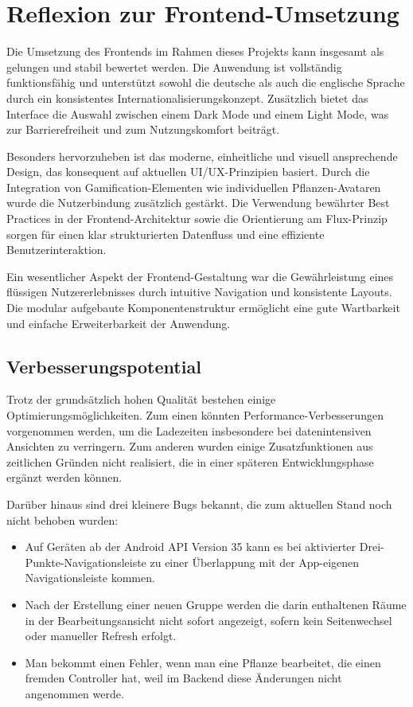 \section{Reflexion zur Frontend-Umsetzung}

Die Umsetzung des Frontends im Rahmen dieses Projekts kann insgesamt als gelungen und stabil bewertet werden. Die Anwendung ist vollständig funktionsfähig und unterstützt sowohl die deutsche als auch die englische Sprache durch ein konsistentes Internationalisierungskonzept. Zusätzlich bietet das Interface die Auswahl zwischen einem Dark Mode und einem Light Mode, was zur Barrierefreiheit und zum Nutzungskomfort beiträgt.

Besonders hervorzuheben ist das moderne, einheitliche und visuell ansprechende Design, das konsequent auf aktuellen UI/UX-Prinzipien basiert. Durch die Integration von Gamification-Elementen wie individuellen Pflanzen-Avataren wurde die Nutzerbindung zusätzlich gestärkt. Die Verwendung bewährter Best Practices in der Frontend-Architektur sowie die Orientierung am Flux-Prinzip sorgen für einen klar strukturierten Datenfluss und eine effiziente Benutzerinteraktion.

Ein wesentlicher Aspekt der Frontend-Gestaltung war die Gewährleistung eines flüssigen Nutzererlebnisses durch intuitive Navigation und konsistente Layouts. Die modular aufgebaute Komponentenstruktur ermöglicht eine gute Wartbarkeit und einfache Erweiterbarkeit der Anwendung.

\subsection{Verbesserungspotential}

Trotz der grundsätzlich hohen Qualität bestehen einige Optimierungsmöglichkeiten. Zum einen könnten Performance-Verbesserungen vorgenommen werden, um die Ladezeiten insbesondere bei datenintensiven Ansichten zu verringern. Zum anderen wurden einige Zusatzfunktionen aus zeitlichen Gründen nicht realisiert, die in einer späteren Entwicklungsphase ergänzt werden können.

Darüber hinaus sind drei kleinere Bugs bekannt, die zum aktuellen Stand noch nicht behoben wurden:

\begin{itemize}
	\item Auf Geräten ab der Android API Version 35 kann es bei aktivierter Drei-Punkte-Navigationsleiste zu einer Überlappung mit der App-eigenen Navigationsleiste kommen.
	\item Nach der Erstellung einer neuen Gruppe werden die darin enthaltenen Räume in der Bearbeitungsansicht nicht sofort angezeigt, sofern kein Seitenwechsel oder manueller Refresh erfolgt.
    \item Man bekommt einen Fehler, wenn man eine Pflanze bearbeitet, die einen fremden Controller hat, weil im Backend diese Änderungen nicht angenommen werde.
\end{itemize}

